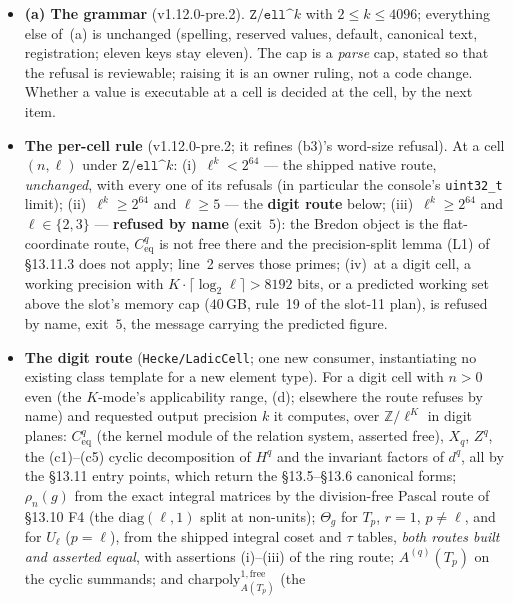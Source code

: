 \documentclass[11pt]{article}
\theoremstyle{remark}
\newcommand{\Z}{\mathbb{Z}}
\begin{document}
\begin{itemize}
\item \textbf{(a) The grammar} (v1.12.0-pre.2). $\texttt{Z/ell\textasciicircum}k$ with
  $2\le k\le4096$; everything else of~(a) is unchanged (spelling, reserved values, default,
  canonical text, registration; eleven keys stay eleven). The cap is a \emph{parse} cap, stated so
  that the refusal is reviewable; raising it is an owner ruling, not a code change. Whether a value
  is executable at a cell is decided at the cell, by the next item.
\item \textbf{The per-cell rule} (v1.12.0-pre.2; it refines (b3)'s word-size refusal). At a cell
  $(n,\ell)$ under $\texttt{Z/ell\textasciicircum}k$: (i)~$\ell^k<2^{64}$ --- the shipped native
  route, \emph{unchanged}, with every one of its refusals (in particular the console's
  \texttt{uint32\_t} limit); (ii)~$\ell^k\ge2^{64}$ and $\ell\ge5$ --- the \textbf{digit route}
  below; (iii)~$\ell^k\ge2^{64}$ and $\ell\in\{2,3\}$ --- \textbf{refused by name} (exit~$5$): the
  Bredon object is the flat-coordinate route, $C^q_{\mathrm{eq}}$ is not free there and the
  precision-split lemma (L1) of \S13.11.3 does not apply; line~2 serves those primes;
  (iv)~at a digit cell, a working precision with $K\cdot\lceil\log_2\ell\rceil>8192$ bits, or a
  predicted working set above the slot's memory cap ($40$\,GB, rule~19 of the slot-11 plan), is
  refused by name, exit~$5$, the message carrying the predicted figure.
\item \textbf{The digit route} (\texttt{Hecke/LadicCell}; one new consumer, instantiating no
  existing class template for a new element type). For a digit cell with $n>0$ even (the
  $K$-mode's applicability range, (d); elsewhere the route refuses by name) and requested output
  precision $k$ it computes, over $\Z/\ell^{K}$ in digit planes: $C^q_{\mathrm{eq}}$ (the kernel
  module of the relation system, asserted free), $X_q$, $Z^q$, the (c1)--(c5) cyclic decomposition
  of $H^q$ and the invariant factors of $d^q$, all by the \S13.11 entry points, which return the
  \S13.5--\S13.6 canonical forms; $\rho_n(g)$ from the exact integral matrices by the division-free
  Pascal route of \S13.10 F4 (the $\mathrm{diag}(\ell,1)$ split at non-units); $\Theta_g$ for $T_p$,
  $r=1$, $p\ne\ell$, and for $U_\ell$ ($p=\ell$), from the shipped integral coset and $\tau$ tables,
  \emph{both routes built and asserted equal}, with assertions (i)--(iii) of the ring route;
  $A^{(q)}(T_p)$ on the cyclic summands; and $\mathrm{charpoly}_{A(T_p)}^{1,\mathrm{free}}$ (the

\end{itemize}
\end{document}
